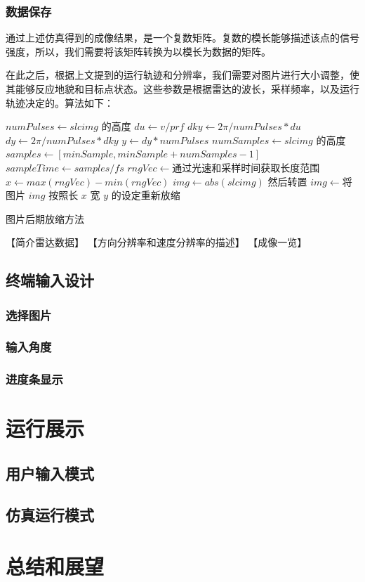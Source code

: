 \documentclass{xduugthesis}
\begin{document}
\subsection{数据保存}
通过上述仿真得到的成像结果，是一个复数矩阵。复数的模长能够描述该点的信号强度，所以，我们需要将该矩阵转换为以模长为数据的矩阵。\par
在此之后，根据上文提到的运行轨迹和分辨率，我们需要对图片进行大小调整，使其能够反应地貌和目标点状态。这些参数是根据雷达的波长，采样频率，以及运行轨迹决定的。算法如下：
\IncMargin{1em}
\begin{algorithm}
	$numPulses \leftarrow slcimg$ 的高度 
	$du \leftarrow v/prf $
	$dky \leftarrow 2\pi /numPulses*du $
	$dy \leftarrow 2\pi / numPulses*dky $
	$y \leftarrow dy * numPulses$ \;
	$numSamples \leftarrow slcimg$ 的高度 
	$samples \leftarrow [minSample, minSample + numSamples - 1] $
	$sampleTime \leftarrow samples / fs $
	$rngVec \leftarrow $通过光速和采样时间获取长度范围\;
	$x \leftarrow max(rngVec) - min(rngVec)$\;
	$img \leftarrow abs(slcimg)$ 然后转置\;
	$img \leftarrow $将图片 $img$ 按照长 $x$ 宽 $y$ 的设定重新放缩\;
	\caption{图片后期放缩方法}
\end{algorithm}
\DecMargin{1em}

【简介雷达数据】
【方向分辨率和速度分辨率的描述】
【成像一览】
\section{终端输入设计}
\subsection{选择图片}
\subsection{输入角度}
\subsection{进度条显示}
\chapter{运行展示}
\section{用户输入模式}
\section{仿真运行模式}

\chapter{总结和展望}
\end{document}
